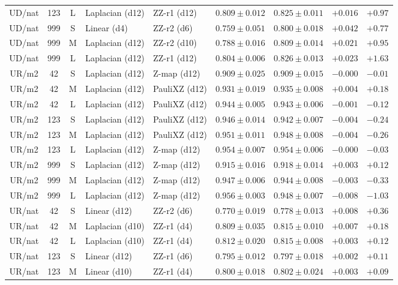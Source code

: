 \documentclass[journal]{IEEEtran}
\begin{document}
\begin{table}[!t]
\begin{tabular}{@{}ccc ll cc rr@{}}
UD/nat & 123 & L & Laplacian (d12) & ZZ-r1 (d12) & $0.809\pm0.012$ & $0.825\pm0.011$ & $+0.016$ & $+0.97$ \\
UD/nat & 999 & S & Linear (d4) & ZZ-r2 (d6) & $0.759\pm0.051$ & $0.800\pm0.018$ & $+0.042$ & $+0.77$ \\
UD/nat & 999 & M & Laplacian (d12) & ZZ-r2 (d10) & $0.788\pm0.016$ & $0.809\pm0.014$ & $+0.021$ & $+0.95$ \\
UD/nat & 999 & L & Laplacian (d12) & ZZ-r1 (d12) & $0.804\pm0.006$ & $0.826\pm0.013$ & $+0.023$ & $+1.63$ \\
UR/m2 & 42 & S & Laplacian (d12) & Z-map (d12) & $0.909\pm0.025$ & $0.909\pm0.015$ & $-0.000$ & $-0.01$ \\
UR/m2 & 42 & M & Laplacian (d12) & PauliXZ (d12) & $0.931\pm0.019$ & $0.935\pm0.008$ & $+0.004$ & $+0.18$ \\
UR/m2 & 42 & L & Laplacian (d12) & PauliXZ (d12) & $0.944\pm0.005$ & $0.943\pm0.006$ & $-0.001$ & $-0.12$ \\
UR/m2 & 123 & S & Laplacian (d12) & PauliXZ (d12) & $0.946\pm0.014$ & $0.942\pm0.007$ & $-0.004$ & $-0.24$ \\
UR/m2 & 123 & M & Laplacian (d12) & PauliXZ (d12) & $0.951\pm0.011$ & $0.948\pm0.008$ & $-0.004$ & $-0.26$ \\
UR/m2 & 123 & L & Laplacian (d12) & Z-map (d12) & $0.954\pm0.007$ & $0.954\pm0.006$ & $-0.000$ & $-0.03$ \\
UR/m2 & 999 & S & Laplacian (d12) & Z-map (d12) & $0.915\pm0.016$ & $0.918\pm0.014$ & $+0.003$ & $+0.12$ \\
UR/m2 & 999 & M & Laplacian (d12) & Z-map (d12) & $0.947\pm0.006$ & $0.944\pm0.008$ & $-0.003$ & $-0.33$ \\
UR/m2 & 999 & L & Laplacian (d12) & Z-map (d12) & $0.956\pm0.003$ & $0.948\pm0.007$ & $-0.008$ & $-1.03$ \\
UR/nat & 42 & S & Linear (d12) & ZZ-r2 (d6) & $0.770\pm0.019$ & $0.778\pm0.013$ & $+0.008$ & $+0.36$ \\
UR/nat & 42 & M & Laplacian (d10) & ZZ-r1 (d4) & $0.809\pm0.035$ & $0.815\pm0.010$ & $+0.007$ & $+0.18$ \\
UR/nat & 42 & L & Laplacian (d10) & ZZ-r1 (d4) & $0.812\pm0.020$ & $0.815\pm0.008$ & $+0.003$ & $+0.12$ \\
UR/nat & 123 & S & Linear (d12) & ZZ-r1 (d6) & $0.795\pm0.012$ & $0.797\pm0.018$ & $+0.002$ & $+0.11$ \\
UR/nat & 123 & M & Linear (d10) & ZZ-r1 (d4) & $0.800\pm0.018$ & $0.802\pm0.024$ & $+0.003$ & $+0.09$ \\

\end{tabular}
\end{table}
\end{document}

